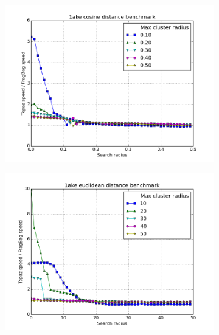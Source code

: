 \documentclass[review,preprint,12pt]{elsarticle}
\theoremstyle{definition}
\theoremstyle{remark}
\numberwithin{equation}{section}
\begin{document}
\begin{figure}[tbp]
\begin{subfigure}[b]{0.40\textwidth}
        \includegraphics[width=1\textwidth]{assets/1ake_cosine.png}
    \end{subfigure}%
    \begin{subfigure}[b]{0.40\textwidth}
        \includegraphics[width=1\textwidth]{assets/1ake_euclid.png}
    \end{subfigure}
    \begin{subfigure}[b]{0.40\textwidth}

\end{subfigure}
\end{figure}
\end{document}
